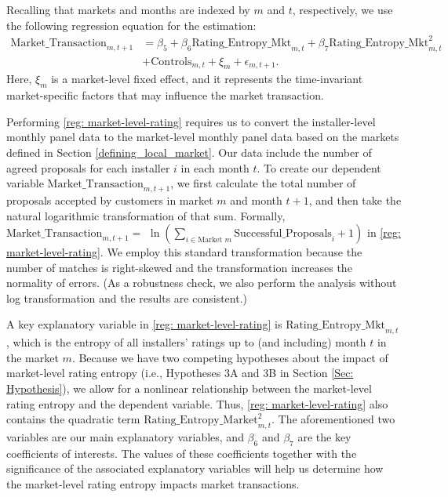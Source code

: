 \documentclass[mnsc,blindrev]{informs3}
\begin{document}
	
	
	Recalling that markets and months are indexed by $m$ and $t$, respectively, we use the following regression equation for the estimation:
	\begin{align} \nonumber
	\text{Market\_Transaction}_{m,t+1} & =\beta_{5} + \beta_{6} \text{Rating\_Entropy\_Mkt}_{m,t}+ \beta_{7} \text{Rating\_Entropy\_Mkt}_{m,t}^2\\ \label{reg: market-level-rating}
	&+ \text{Controls}_{m,t}  + \xi_{m} + \epsilon_{m,t+1}.
	\end{align}
	Here, $\xi_{m}$ is a market-level fixed effect, and it represents the time-invariant market-specific factors that may influence the market transaction.

	Performing \eqref{reg: market-level-rating} requires us to convert the installer-level monthly panel data to the market-level monthly panel data based on the markets defined in Section \ref{defining_local_market}. Our data include the number of agreed proposals for each installer $i$ in each month $t$. To create our dependent variable $\text{Market\_Transaction}_{m,t+1}$, we first calculate the total number of proposals accepted by customers in market $m$ and month $t+1$, and then take the natural logarithmic transformation of that sum. Formally, $\text{Market\_Transaction}_{m,t+1} =$ $\ln\left( \sum_{i \in \text{Market\ } m} \text{Successful\_Proposals}_{i}+ 1 \right)$ in \eqref{reg: market-level-rating}.  We employ this standard transformation because the number of matches is right-skewed and the transformation increases the normality of errors. (As a robustness check, we also perform the analysis without log transformation and the results are consistent.)
	
	A key explanatory variable in \eqref{reg: market-level-rating} is $\text{Rating\_Entropy\_Mkt}_{m,t}$, which is the entropy of all installers' ratings up to (and including) month $t$ in the market $m$.
	Because we have two competing hypotheses about the impact of market-level rating entropy (i.e., Hypotheses 3A and 3B in Section \ref{Sec: Hypothesis}), we allow for a  nonlinear relationship between the market-level rating entropy and the dependent variable. Thus, \eqref{reg: market-level-rating} also contains the quadratic term  $\text{Rating\_Entropy\_Market}_{m,t}^{2}$. The aforementioned two variables are our main explanatory variables, and $\beta_{6}$ and $\beta_{7}$ are the key coefficients of interests. The values of these coefficients together with the significance of the associated explanatory variables will help us determine how the market-level rating entropy impacts market transactions.
	
\end{document}
